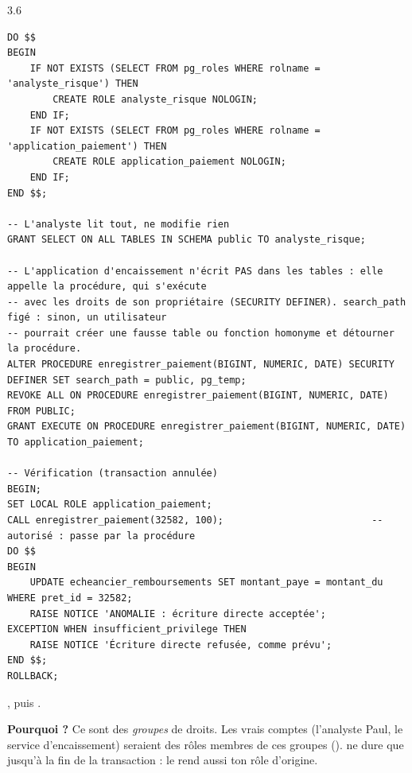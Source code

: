 \begin{correction}{3.6}
\begin{lstlisting}[style=long]
DO $$
BEGIN
    IF NOT EXISTS (SELECT FROM pg_roles WHERE rolname = 'analyste_risque') THEN
        CREATE ROLE analyste_risque NOLOGIN;
    END IF;
    IF NOT EXISTS (SELECT FROM pg_roles WHERE rolname = 'application_paiement') THEN
        CREATE ROLE application_paiement NOLOGIN;
    END IF;
END $$;

-- L'analyste lit tout, ne modifie rien
GRANT SELECT ON ALL TABLES IN SCHEMA public TO analyste_risque;

-- L'application d'encaissement n'écrit PAS dans les tables : elle appelle la procédure, qui s'exécute
-- avec les droits de son propriétaire (SECURITY DEFINER). search_path figé : sinon, un utilisateur
-- pourrait créer une fausse table ou fonction homonyme et détourner la procédure.
ALTER PROCEDURE enregistrer_paiement(BIGINT, NUMERIC, DATE) SECURITY DEFINER SET search_path = public, pg_temp;
REVOKE ALL ON PROCEDURE enregistrer_paiement(BIGINT, NUMERIC, DATE) FROM PUBLIC;
GRANT EXECUTE ON PROCEDURE enregistrer_paiement(BIGINT, NUMERIC, DATE) TO application_paiement;

-- Vérification (transaction annulée)
BEGIN;
SET LOCAL ROLE application_paiement;
CALL enregistrer_paiement(32582, 100);                          -- autorisé : passe par la procédure
DO $$
BEGIN
    UPDATE echeancier_remboursements SET montant_paye = montant_du WHERE pret_id = 32582;
    RAISE NOTICE 'ANOMALIE : écriture directe acceptée';
EXCEPTION WHEN insufficient_privilege THEN
    RAISE NOTICE 'Écriture directe refusée, comme prévu';
END $$;
ROLLBACK;
\end{lstlisting}

\begin{resultat}
, puis
.
\end{resultat}

\textbf{Pourquoi  ?} Ce sont des \emph{groupes} de droits. Les vrais comptes (l'analyste
Paul, le service d'encaissement) seraient des rôles  membres de ces groupes
().  ne dure que jusqu'à la fin de la
transaction : le  rend aussi ton rôle d'origine.
\end{correction}
